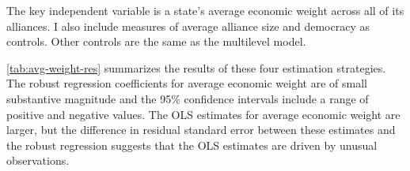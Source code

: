\documentclass[12pt]{article}
\begin{document}
The key independent variable is a state's average economic weight across all of its alliances. 
I also include measures of average alliance size and democracy \citep{DigiuseppePoast2016} as controls. 
Other controls are the same as the multilevel model.  


\autoref{tab:avg-weight-res} summarizes the results of these four estimation strategies. 
The robust regression coefficients for average economic weight are of small substantive magnitude and the 95\% confidence intervals include a range of positive and negative values. 
The OLS estimates for average economic weight are larger, but the difference in residual standard error between these estimates and the robust regression suggests that the OLS estimates are driven by unusual observations. 
\end{document}
